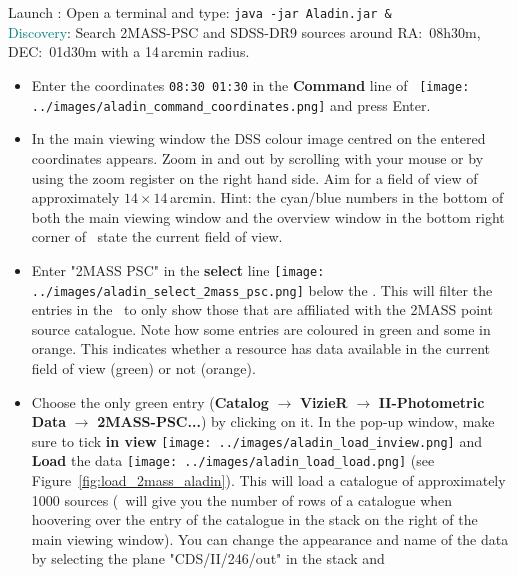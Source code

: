 \documentclass [a4paper, 12pt]{article}
\begin{document}
\section{\aladin}
Launch \aladin: Open a terminal and type: \texttt{java -jar Aladin.jar \&} \\

\noindent \textcolor{teal}{Discovery}: Search 2MASS-PSC and SDSS-DR9 sources
around RA:~08h30m, DEC:~01d30m with a 14\,arcmin radius.
\begin{itemize}
    \item Enter the coordinates \texttt{08:30 01:30} in the \textbf{Command}
    line of \aladin\ \texttt{[image: ../images/aladin\_command\_coordinates.png]} and press Enter.
    \item In the main viewing window the DSS colour image centred on the
    entered coordinates appears. Zoom in and out by scrolling with your mouse
    or by using the zoom register on the right hand side. Aim for a field of
    view of approximately $14\times14$\,arcmin. Hint: the
    cyan/blue numbers in the bottom of both the main viewing window and the
    overview window in the bottom right corner of \aladin\ state the current
    field of view.
    \item Enter "2MASS PSC" in the \textbf{select} line
    \texttt{[image: ../images/aladin\_select\_2mass\_psc.png]} below the \datatree.
    This will filter the entries in the \datatree\ to only show those that are
    affiliated with the 2MASS point source catalogue. Note how some entries are
    coloured in green and some in orange. This indicates whether a resource
    has data available in the current field of view (green) or not (orange).
    \item Choose the only green entry (\textbf{Catalog} $\rightarrow$
    \textbf{VizieR} $\rightarrow$ \textbf{II-Photometric Data} $\rightarrow$
    \textbf{2MASS-PSC...}) by clicking on it. In the pop-up window, make sure
    to tick \textbf{in view} \texttt{[image: ../images/aladin\_load\_inview.png]} and \textbf{Load} the data
    \texttt{[image: ../images/aladin\_load\_load.png]} (see
    Figure~\ref{fig:load_2mass_aladin}). This will load a catalogue of
    approximately 1000 sources (\aladin\ will give you the number of rows of a
    catalogue when hoovering over the entry of the catalogue in the stack on
    the right of the main viewing window). You can change the appearance and
    name of the data by selecting the plane "CDS/II/246/out" in the stack and

\end{itemize}
\end{document}
